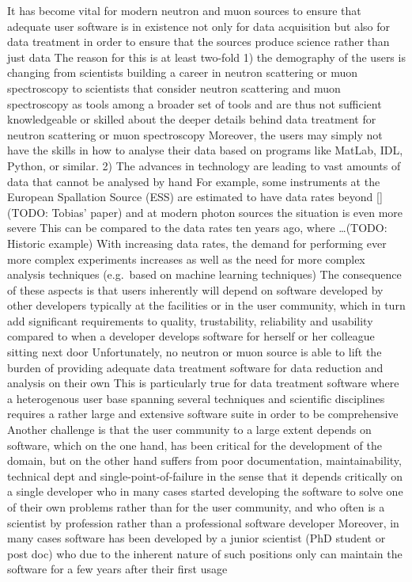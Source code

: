 \documentclass[jnr]{iosart2x}
\begin{document}
It has become vital for modern neutron and muon sources to ensure that adequate user software is in existence not only for data acquisition but also for data treatment in order to ensure that the sources produce science rather than just data
The reason for this is at least two-fold 1) the demography of the users is changing from scientists building a career in neutron scattering or muon spectroscopy to scientists that consider neutron scattering and muon spectroscopy as tools among a broader set of tools and are thus not sufficient knowledgeable or skilled about the deeper details behind data treatment for neutron scattering or muon spectroscopy
Moreover, the users may simply not have the skills in how to analyse their data based on programs like MatLab, IDL, Python, or similar. 2) The advances in technology are leading to vast amounts of data that cannot be analysed by hand
For example, some instruments at the
European Spallation Source (ESS) are estimated to have data rates beyond [](TODO: Tobias’ paper) and at modern photon sources the situation is even more severe
This can be compared to the data rates ten years ago, where …(TODO: Historic example)
With increasing data rates, the demand for performing ever more complex experiments increases as well as the need for more complex analysis techniques (e.g.\ based on machine learning techniques)
The consequence of these aspects is that users inherently will depend on software developed by other developers typically at the facilities or in the user community, which in turn add significant requirements to quality, trustability, reliability and usability compared to when a developer develops software for herself or her colleague sitting next door
 Unfortunately, no neutron or muon source is able to lift the burden of providing adequate data treatment software for data reduction and analysis on their own
This is particularly true for data treatment software where a heterogenous user base spanning several techniques and scientific disciplines requires a rather large and extensive software suite in order to be comprehensive
Another challenge is that the user community to a large extent depends on software, which on the one hand, has been critical for the development of the domain, but on the other hand suffers from poor documentation, maintainability, technical dept and single-point-of-failure in the sense that it depends critically on a single developer who in many cases started developing the software to solve one of their own problems rather than for the user community, and who often is a scientist by profession rather than a professional software developer
Moreover, in many cases software has been developed by a junior scientist (PhD student or post doc) who due to the inherent nature of such positions only can maintain the software for a few years after their first usage
\end{document}
